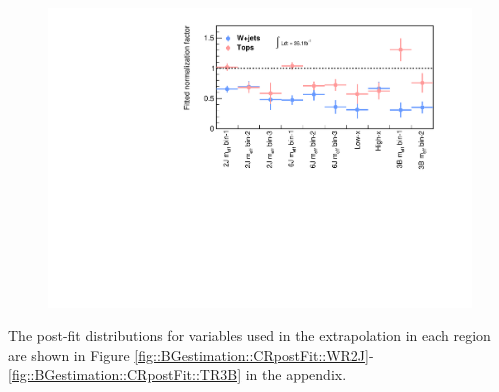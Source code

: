 \begin{figure}[h]
  \begin{center}
    \includegraphics[width=160mm]{figures/BGestimation/fittedSFs/SFs.pdf}
    \label{fig::BGestimation::fittedSFs}
  \end{center}
\end{figure}

The post-fit distributions for variables used in the extrapolation in each region are shown in Figure \ref{fig::BGestimation::CRpostFit::WR2J}-\ref{fig::BGestimation::CRpostFit::TR3B} in the appendix. 

%

%
%



\clearpage


\clearpage
%

\clearpage
